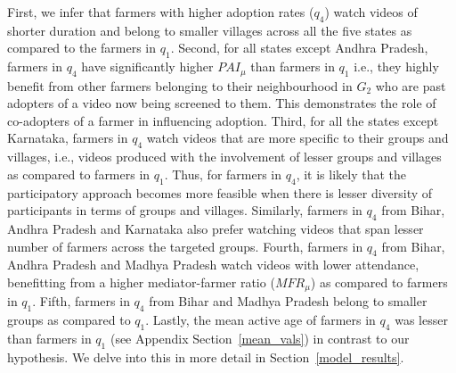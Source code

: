 \documentclass[manuscript,screen]{acmart}
\begin{document}
\begin{table*}[!h]
  \caption{\textbf{One-Tailed Welch \textit{t}-Tests for ten factors between farmers in $q_{1}$ and $q_{4}$ of adoption rates. \textit{t}-stat is reported only in cells where $\alpha = 0.001$ after adjusting $p$ values as per the Bonferroni correction (number of measures $m=10$).}}
  \label{tab:differential_tests}
\end{table*}

First, we infer that farmers with higher adoption rates ($q_{4}$) watch videos of shorter duration and belong to smaller villages across all the five states as compared to the farmers in $q_{1}$. Second, for all states except Andhra Pradesh, farmers in $q_{4}$ have significantly higher $PAI_{\mu}$ than farmers in $q_{1}$ i.e., they highly benefit from other farmers belonging to their neighbourhood in $G_{2}$ who are past adopters of a video now being screened to them. This demonstrates the role of co-adopters of a farmer in influencing adoption. Third, for all the states except Karnataka, farmers in $q_{4}$ watch videos that are more specific to their groups and villages, i.e., videos produced with the involvement of lesser groups and villages as compared to farmers in $q_{1}$. Thus, for farmers in $q_{4}$, it is likely that the participatory approach becomes more feasible when there is lesser diversity of participants in terms of groups and villages. Similarly, farmers in $q_{4}$ from Bihar, Andhra Pradesh and Karnataka also prefer watching videos that span lesser number of farmers across the targeted groups. Fourth, farmers in $q_{4}$ from Bihar, Andhra Pradesh and Madhya Pradesh watch videos with lower attendance, benefitting from a higher mediator-farmer ratio ($MFR_{\mu}$) as compared to farmers in $q_{1}$. Fifth, farmers in $q_{4}$ from Bihar and Madhya Pradesh belong to smaller groups as compared to $q_{1}$. Lastly, the mean active age of farmers in $q_{4}$ was lesser than farmers in $q_{1}$ (see Appendix Section~\ref{mean_vals}) in contrast to our hypothesis. We delve into this in more detail in Section~\ref{model_results}.
\end{document}
